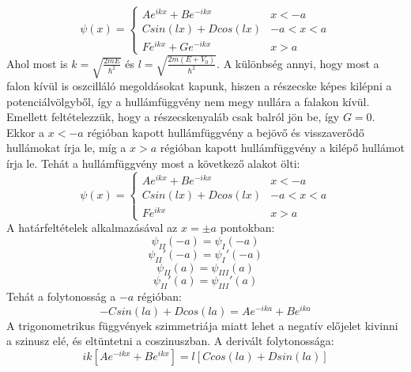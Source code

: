 \documentclass[../main.tex]{subfiles}
\begin{document}
\begin{equation}
\psi(x) = \begin{cases}
    A e^{i k x} + B e^{- i k x} & x < -a \\
    C sin(l x) + D cos(l x) & -a < x < a \\
    F e^{i k x} + G e^{- i k x} & x > a
    \end{cases}
\end{equation}
Ahol most is $k = \sqrt{\frac{2mE}{\hbar^2}}$ és $l = \sqrt{\frac{2m(E + V_0)}{\hbar^2}}$. A különbség annyi, hogy most
a falon kívül is oszcilláló megoldásokat kapunk, hiszen a részecske képes kilépni a potenciálvölgyből, így a hullámfüggvény nem megy nullára a falakon kívül.
Emellett feltételezzük, hogy a részecskenyaláb csak balról jön be, így $G = 0$. Ekkor a $x < -a$ régióban kapott hullámfüggvény
a bejövő és visszaverődő hullámokat írja le, míg a $x > a$ régióban kapott hullámfüggvény a kilépő hullámot írja le.
Tehát a hullámfüggvény most a következő alakot ölti:
\begin{equation}
\psi(x) = \begin{cases}
    A e^{i k x} + B e^{- i k x} & x < -a \\
    C sin(l x) + D cos(l x) & -a < x < a \\
    F e^{i k x} & x > a
    \end{cases}
\end{equation}
A határfeltételek alkalmazásával az $x = \pm a$ pontokban:
\begin{equation}
    \psi_{II}(-a) = \psi_{I}(-a)
\end{equation}
\begin{equation}
    \psi_{II}'(-a) = \psi_{I}'(-a)
\end{equation}
\begin{equation}
    \psi_{II}(a) = \psi_{III}(a)
\end{equation}
\begin{equation}
    \psi_{II}'(a) = \psi_{III}'(a)
\end{equation}
Tehát a folytonosság a $-a$ régióban:
\begin{equation}
    - C sin(l a) + D cos(l a) = A e^{- i k a} + B e^{i k a}
\end{equation}
A trigonometrikus függvények szimmetriája miatt lehet a negatív előjelet kivinni a szinusz elé, és eltüntetni a coszinuszban. A derivált folytonossága:
\begin{equation}
    ik \left[Ae^{- i k x} + B e^{i k x}\right] = l \left[C cos(l a) + D sin(l a)\right]
\end{equation}
\end{document}
